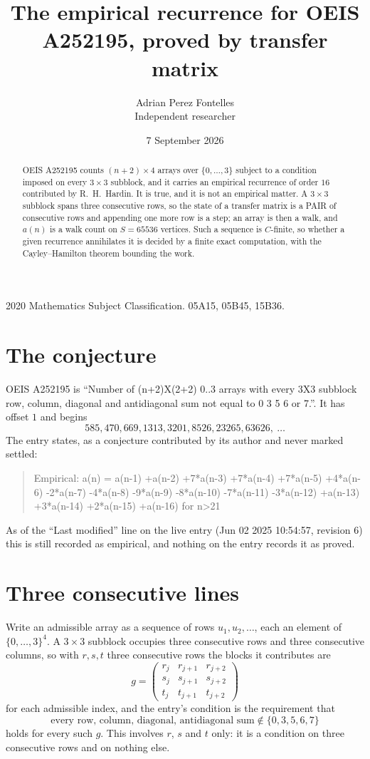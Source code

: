 \documentclass[11pt,a4paper]{article}
\title{The empirical recurrence for OEIS A252195, proved by transfer matrix}
\author{Adrian Perez Fontelles\\ \small Independent researcher}
\date{7 September 2026}
\theoremstyle{plain}
\theoremstyle{definition}
\begin{document}
\maketitle

\begin{abstract}
OEIS A252195 counts $(n+2)\times4$ arrays over $\{0,\dots,3\}$ subject to a condition imposed on
every $3\times3$ subblock, and it carries an empirical recurrence of order $16$
contributed by R.~H.~Hardin. It is true, and it is not an empirical matter. A $3\times3$
subblock spans three consecutive rows, so the state of a transfer matrix is a PAIR of
consecutive rows and appending one more row is a step; an array is then a walk, and
$a(n)$ is a walk count on $S=65536$ vertices. Such a sequence is $C$-finite, so whether a given
recurrence annihilates it is decided by a finite exact computation, with the Cayley--Hamilton
theorem bounding the work.
\end{abstract}

\noindent\small 2020 Mathematics Subject Classification. 05A15, 05B45, 15B36.\normalsize

\section{The conjecture}

OEIS A252195 is ``Number of (n+2)X(2+2) 0..3 arrays with every 3X3 subblock row, column, diagonal and antidiagonal sum not equal to 0 3 5 6 or 7.''. It has offset $1$ and begins
\[
585, 470, 669, 1313, 3201, 8526, 23265, 63626,\ \dots
\]
The entry states, as a conjecture contributed by its author and never marked settled:
\begin{quote}
Empirical: a(n) = a(n-1) +a(n-2) +7*a(n-3) +7*a(n-4) +7*a(n-5) +4*a(n-6) -2*a(n-7) -4*a(n-8) -9*a(n-9) -8*a(n-10) -7*a(n-11) -3*a(n-12) +a(n-13) +3*a(n-14) +2*a(n-15) +a(n-16) for n>21
\end{quote}
As of the ``Last modified'' line on the live entry (Jun 02 2025 10:54:57, revision 6) this is still
recorded as empirical, and nothing on the entry records it as proved.

\section{Three consecutive lines}

Write an admissible array as a sequence of rows $u_1,u_2,\dots$, each an element of
$\{0,\dots,3\}^{4}$. A $3\times3$ subblock occupies three consecutive rows and
three consecutive columns, so with $r,s,t$ three consecutive rows the blocks it
contributes are
\[
g=\begin{pmatrix}r_j&r_{j+1}&r_{j+2}\\ s_j&s_{j+1}&s_{j+2}\\ t_j&t_{j+1}&t_{j+2}\end{pmatrix}
\]
for each admissible index, and the entry's condition is the requirement that
\[
\text{every row, column, diagonal, antidiagonal sum} \notin \{0,3,5,6,7\}
\]
holds for every such $g$. This involves $r$, $s$ and $t$ only: it is a condition on
three consecutive rows and on nothing else.
\end{document}

